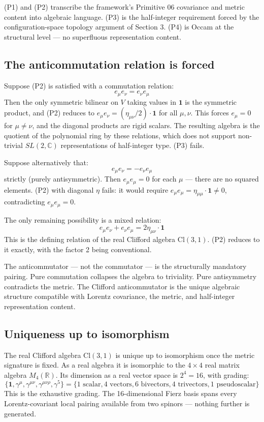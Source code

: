 \documentclass[11pt,a4paper]{article}
\begin{document}
(P1) and (P2) transcribe the framework's Primitive 06 covariance and metric content into algebraic language. (P3) is the half-integer requirement forced by the configuration-space topology argument of Section 3. (P4) is Occam at the structural level --- no superfluous representation content.

\subsection{The anticommutation relation is forced}

Suppose (P2) is satisfied with a commutation relation:
\[
e_\mu e_\nu = e_\nu e_\mu
\]
Then the only symmetric bilinear on $V$ taking values in $\mathbf{1}$ is the symmetric product, and (P2) reduces to $e_\mu e_\nu = (\eta_{\mu\nu}/2)\cdot\mathbf{1}$ for all $\mu, \nu$. This forces $e_\mu = 0$ for $\mu \neq \nu$, and the diagonal products are rigid scalars. The resulting algebra is the quotient of the polynomial ring by these relations, which does not support non-trivial $SL(2, \mathbb{C})$ representations of half-integer type. (P3) fails.

Suppose alternatively that:
\[
e_\mu e_\nu = -e_\nu e_\mu
\]
strictly (purely antisymmetric). Then $e_\mu e_\mu = 0$ for each $\mu$ --- there are no squared elements. (P2) with diagonal $\eta$ fails: it would require $e_\mu e_\mu = \eta_{\mu\mu}\cdot\mathbf{1} \neq 0$, contradicting $e_\mu e_\mu = 0$.

The only remaining possibility is a mixed relation:
\[
e_\mu e_\nu + e_\nu e_\mu = 2\eta_{\mu\nu}\cdot\mathbf{1}
\]
This is the defining relation of the real Clifford algebra $\mathrm{Cl}(3,1)$. (P2) reduces to it exactly, with the factor 2 being conventional.

The anticommutator --- not the commutator --- is the structurally mandatory pairing. Pure commutation collapses the algebra to triviality. Pure antisymmetry contradicts the metric. The Clifford anticommutator is the unique algebraic structure compatible with Lorentz covariance, the metric, and half-integer representation content.

\subsection{Uniqueness up to isomorphism}

The real Clifford algebra $\mathrm{Cl}(3,1)$ is unique up to isomorphism once the metric signature is fixed. As a real algebra it is isomorphic to the $4\times 4$ real matrix algebra $M_4(\mathbb{R})$. Its dimension as a real vector space is $2^4 = 16$, with grading:
\[
\{\mathbf{1}, \gamma^\mu, \gamma^{\mu\nu}, \gamma^{\mu\nu\rho}, \gamma^5\} = \{1\text{ scalar}, 4\text{ vectors}, 6\text{ bivectors}, 4\text{ trivectors}, 1\text{ pseudoscalar}\}
\]
This is the exhaustive grading. The 16-dimensional Fierz basis spans every Lorentz-covariant local pairing available from two spinors --- nothing further is generated.
\end{document}
